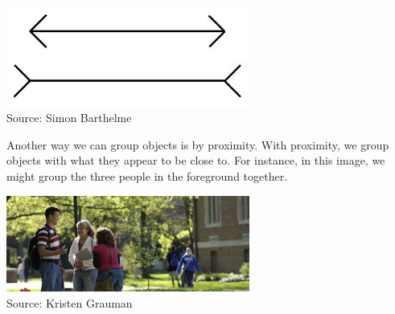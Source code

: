 \documentclass{article}
\begin{document}
\begin{center}
\includegraphics[width=8cm]{muller.jpg} \\
Source: Simon Barthelme
\end{center}

Another way we can group objects is by proximity. With proximity, we group objects with what they appear to be close to. For instance, in this image, we might group the three people in the foreground together.
\begin{center}
\includegraphics[width=8cm]{people.png} \\
Source: Kristen Grauman
\end{center}


\small


\end{document}

